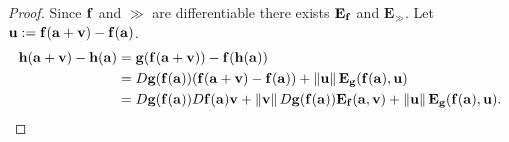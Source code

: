 \vspace{-1em}

\begin{proof}
    Since \(\ff\) and \(\gg\) are differentiable there exists \(\mathbf{E}_{\ff}\) and \(\mathbf{E}_{\gg}\).
    Let \(\uu := \ff(\aa+\vv) - \ff(\aa) \).
    \[
        \begin{aligned}
            \hh(\aa+\vv) - \hh(\aa)
             & = \gg(\ff(\aa+\vv)) - \ff(\hh(\aa))                                                                                               \\
             & = D\gg(\ff(\aa))(\ff(\aa+\vv) - \ff(\aa) ) + \norm{\uu}\mathbf{E}_{\gg}(\ff(\aa),\uu)                                             \\
             & = D\gg(\ff(\aa))   D\ff(\aa) \vv + \norm{\vv}D\gg(\ff(\aa))\mathbf{E}_{\ff}(\aa, \vv) + \norm{\uu}\mathbf{E}_{\gg}(\ff(\aa),\uu).
        \end{aligned} \qedhere
    \]
\end{proof}




